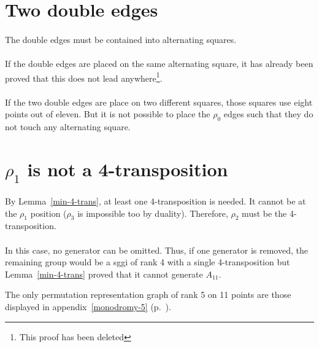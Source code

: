 \section{Two double edges}

\paragraph{}
The double edges must be contained into alternating squares.

\paragraph{}
If the double edges are placed on the same alternating square, it has already been proved that this does not lead anywhere\footnote{This proof has been deleted}.

\paragraph{}
If the two double edges are place on two different squares, those squares use eight points out of eleven. But it is not possible to place the $\rho_0$ edges such that they do not touch any alternating square.

\section{$\rho_1$ is not a 4-transposition}

\paragraph{}
By Lemma~\ref{min-4-trans}, at least one 4-transposition is needed. It cannot be at the $\rho_1$ position ($\rho_3$ is impossible too by duality). Therefore, $\rho_2$ must be the 4-transposition.

\paragraph{}
In this case, no generator can be omitted. Thus, if one generator is removed, the remaining group would be a sggi of rank 4 with a single 4-transposition but Lemma~\ref{min-4-trans} proved that it cannot generate $A_{11}$.

\begin{theorem}
  The only permutation representation graph of rank 5 on 11 points are those displayed in appendix~\ref{monodromy-5} (p.~\pageref{monodromy-5}).
\end{theorem}

